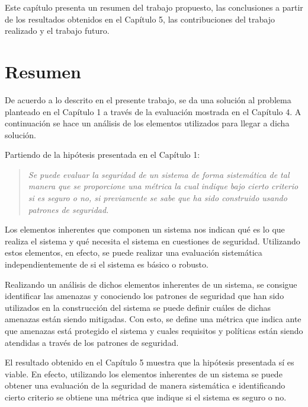 Este capítulo presenta un resumen del trabajo propuesto, las conclusiones a partir de los resultados obtenidos en el Capítulo 5, las contribuciones del trabajo realizado y el trabajo futuro.

\section{Resumen}

De acuerdo a lo descrito en el presente trabajo, se da una solución al problema planteado en el Capítulo 1 a través de la evaluación mostrada en el Capítulo 4. A continuación se hace un análisis de los elementos utilizados para llegar a dicha solución.

\vspace{0.3cm}

Partiendo de la hipótesis presentada en el Capítulo 1:

\begin{quote}
	\textit{Se puede evaluar la seguridad de un sistema de forma sistemática de tal manera que se proporcione una métrica la cual indique bajo cierto criterio si es seguro o no, si previamente se sabe que ha sido construido usando patrones de seguridad.}
\end{quote}

Los elementos inherentes que componen un sistema nos indican qué es lo que realiza el sistema y qué necesita el sistema en cuestiones de seguridad. Utilizando estos elementos, en efecto, se puede realizar una evaluación sistemática independientemente de si el sistema es básico o robusto.

\vspace{0.3cm}

Realizando un análisis de dichos elementos inherentes de un sistema, se consigue identificar las amenazas y conociendo los patrones de seguridad que han sido utilizados en la construcción del sistema se puede definir cuáles de dichas amenazas están siendo mitigadas. Con esto, se define una métrica que indica ante que amenazas está protegido el sistema y cuales requisitos y políticas están siendo atendidas a través de los patrones de seguridad. 

\vspace{0.3cm}

El resultado obtenido en el Capítulo 5 muestra que la hipótesis presentada sí es viable. En efecto, utilizando los elementos inherentes de un sistema se puede obtener una evaluación de la seguridad de manera sistemática e identificando cierto criterio se obtiene una métrica que indique si el sistema es seguro o no.

